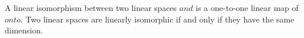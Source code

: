 A linear isomorphism between two linear spaces $ and $ is a one-to-one linear map of $ onto $. Two linear spaces are linearly isomorphic if and only if they have the same dimension.
